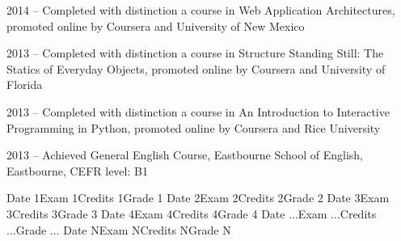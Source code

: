 \documentclass[english,a4paper]{europasscv}
\begin{document}
\begin{europasscv}
\begin{en}
{\begin{ecvitemize}
     \item 2014	-- Completed with distinction a course in Web Application Architectures, promoted online by Coursera and University of New Mexico
     \item 2013 -- Completed with distinction a course in Structure Standing Still: The Statics of Everyday Objects, promoted online by Coursera and University of Florida
     \item 2013 -- Completed with distinction a course in An Introduction to Interactive Programming in Python, promoted online by Coursera and Rice University
     \item 2013 -- Achieved General English Course, Eastbourne School of English, Eastbourne, CEFR level: B1
  \end{ecvitemize}
  } 
  
\newpage
\ecvexames
{Date 1}{Exam 1}{Credits 1}{Grade 1}
{Date 2}{Exam 2}{Credits 2}{Grade 2}
{Date 3}{Exam 3}{Credits 3}{Grade 3}
{Date 4}{Exam 4}{Credits 4}{Grade 4}
{Date ...}{Exam ...}{Credits ...}{Grade ...}
{Date N}{Exam N}{Credits N}{Grade N}

\end{en}

\begin{it}
  

\end{it}
\end{europasscv}
\end{document}
